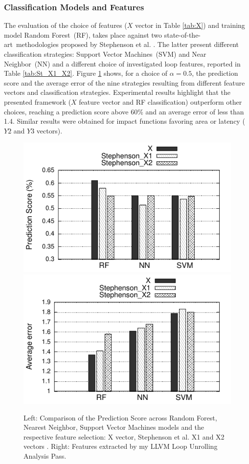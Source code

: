 \documentclass[]{usiinfthesis}
\newcommand{\SoTA}{{state-of-the-art}}
\newcommand{\RF}{{Random Forest}}
\newcommand{\SVM}{{Support Vector Machines}}
\newcommand{\NN}{{Near Neighbor}}
\begin{document}
\subsubsection{Classification Models and Features}
\label{subsec:mode_feature}

The evaluation of the choice of features ($X$ vector in Table \ref{tab:X}) and training model \RF\ 
(RF), takes place against two \SoTA\ methodologies proposed by Stephenson et al. 
\cite{StephensonApr05}. The latter present different classification strategies: 
\SVM\ (SVM) and \NN\ (NN) and a different choice of investigated loop features, reported in 
Table \ref{tab:St_X1_X2}. Figure \ref{fig:mod_score} shows, for a choice of $\alpha = 0.5$, the 
prediction score and the average error of the nine strategies resulting from different feature 
vectors and classification strategies. Experimental results highlight that the presented framework 
($X$ feature vector and RF classification)
outperform other choices, reaching a prediction score above  60\% and an average error of
less than 1.4. Similar results were obtained for impact functions favoring area or latency
($Y2$ and $Y3$ vectors).



\begin{figure}

\centering
  \hspace*{-2cm}
\includegraphics[width= .5 \linewidth]{figs/models_score}
\includegraphics[width= .5 \linewidth]{figs/models_error}
\hspace*{-2cm}
\vspace*{-0.2cm}
\caption{Left: Comparison of the Prediction Score across Random Forest, Nearest Neighbor, Support Vector Machines models 
and the respective feature selection: X vector, Stephenson et al. X1 and X2 vectors \cite{StephensonApr05}.
Right: Features extracted by my LLVM Loop Unrolling Analysis Pass.}
\label{fig:mod_score}
\end{figure}
\end{document}
